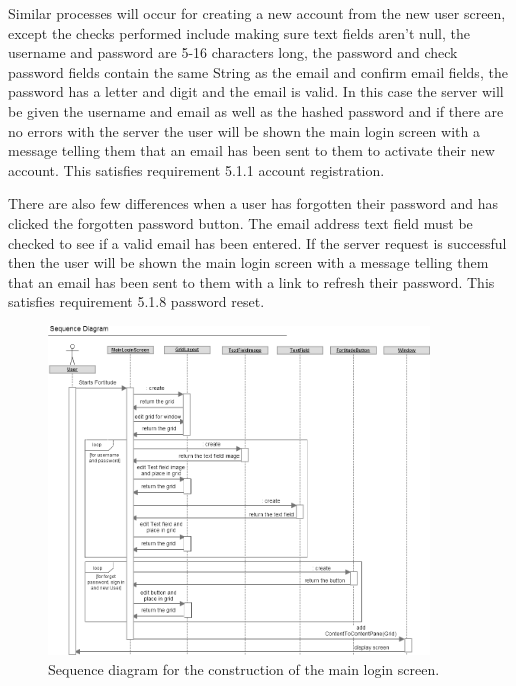 Similar processes will occur for creating a new account from the new user screen, except the checks performed include making sure text fields aren't null, the username and password are 5-16 characters long, the password and check password fields contain the same String as the email and confirm email fields, the password has a letter and digit and the email is valid. In this case the server will be given the username and email as well as the hashed password and if there are no errors with the server the user will be shown the main login screen with a message telling them that an email has been sent to them to activate their new account. This satisfies requirement 5.1.1 account registration.

There are also few differences when a user has forgotten their password and has clicked the forgotten password button. The email address text field must be checked to see if a valid email has been entered. If the server request is successful then the user will be shown the main login screen with a message telling them that an email has been sent to them with a link to refresh their password. This satisfies requirement 5.1.8 password reset.

\begin{figure}[h!]
    \centering
    \includegraphics[width=0.9\textwidth]{images/sequence/createMainLoginScreen}
    \caption{Sequence diagram for the construction of the main login screen.}
    \label{fig:createLogin}
\end{figure}

